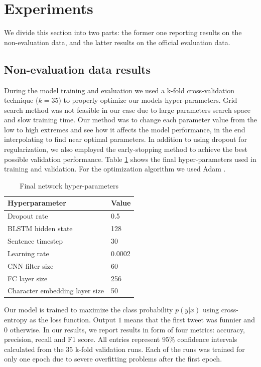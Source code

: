 \documentclass[10pt, a4paper]{article}
\begin{document}
\section{Experiments}
We divide this section into two parts: the former one reporting results on the non-evaluation data, and the latter results on the official evaluation data.

\subsection{Non-evaluation data results}
During the model training and evaluation we used a k-fold cross-validation technique ($k=35$) to properly optimize our models hyper-parameters. Grid search method was not feasible in our case due to large parameters search space and slow training time. Our method was to change each parameter value from the low to high extremes and see how it affects the model performance, in the end interpolating to find near optimal parameters. In addition to using dropout for regularization, we also employed the early-stopping\cite{early_stopping} method to achieve the best possible validation performance. Table \ref{tab:hyperparams} shows the final hyper-parameters used in training and validation. For the optimization algorithm we used Adam \citep{adam2014}.

\begin{table}
\small
\caption{Final network hyper-parameters}
 \label{tab:hyperparams}
 \begin{center}
 \begin{tabular}{ll}
 \toprule
     Hyperparameter & Value\\
 \midrule
     Dropout rate & 0.5\\
     BLSTM hidden state & 128\\
     Sentence timestep & 30\\
     Learning rate & 0.0002\\
     CNN filter size & 60 \\
     FC layer size & 256\\
     Character embedding layer size & 50\\
 \bottomrule
 \end{tabular}
 \end{center}
\end{table}

Our model is trained to maximize the class probability $p(y \vert x)$ using
cross-entropy as the loss function. Output $1$ means that the first tweet was
funnier and $0$ otherwise. 
In our results, we report results in form of
four metrics: accuracy, precision, recall and F1 score. All entries represent
$95\%$ confidence intervals calculated from the $35$ k-fold validation runs.
Each of the runs was trained for only one epoch due to severe overfitting
problems after the first epoch.
\end{document}
